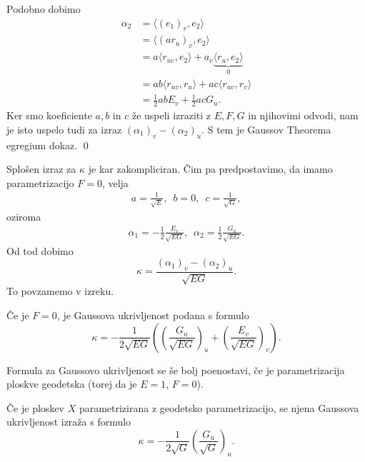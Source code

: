 Podobno dobimo \begin{align*}
    \alpha_2 &= \langle (e_1)_v, e_2 \rangle  \\
     &= \langle (a r_u)_v, e_2 \rangle  \\
     &= a \langle r_{uv}, e_2 \rangle + a_v \underbrace{\langle r_u, e_2 \rangle}_0  \\
    &= ab \langle r_{uv}, r_u \rangle + ac \langle r_{uv}, r_v \rangle \\
    &= \frac{1}{2} ab E_v + \frac{1}{2}ac G_u. 
\end{align*}
Ker smo koeficiente $a, b$ in $c$ že uspeli izraziti z $E, F, G$ in njihovimi odvodi, nam je isto uspelo tudi za izraz $(\alpha_1)_v - (\alpha_2)_u$.
S tem je Gaussov Theorema egregium dokaz.
\qed

\begin{opomba}
Splošen izraz za $\kappa$ je kar zakompliciran. Čim pa predpostavimo, da imamo parametrizacijo $F =0$, velja \begin{align*}
    a = \frac{1}{\sqrt{E} }, \,\,\,  b = 0, \,\,\,   c = \frac{1}{\sqrt{G}},
\end{align*}oziroma \begin{align*}
    \alpha_1 = -\frac{1}{2} \frac{E_v}{\sqrt{EG} }, \,\,\, \alpha_2 = \frac{1}{2} \frac{G_u}{\sqrt{EG} }.
\end{align*}
Od tod dobimo \begin{equation*}
\kappa  = \frac{(\alpha_1)_v - (\alpha_2)_u}{\sqrt{EG}}.
\end{equation*}
To povzamemo v izreku.
\end{opomba}

\begin{izrek}
\label{izr_gaussova_ukrivljenost_v_primeru_F_enako_0}
Če je $F = 0$, je Gaussova ukrivljenost podana s formulo \begin{equation*}
\kappa = - \frac{1}{2\sqrt{EG}} \left(\left(  \frac{G_u}{\sqrt{EG} } \right)_u + \left( \frac{E_v}{\sqrt{EG} } \right)_v \right).
\end{equation*}  
\end{izrek}

Formula za Gaussovo ukrivljenost se še bolj poenostavi, če je parametrizacija ploskve geodetska (torej da je $E = 1$, $F = 0$).

\begin{izrek}
\label{izr_gaussova_ukrivljenost_pri_geodetski_parametrizaciji}
 Če je ploskev $X$ parametrizirana z geodetsko parametrizacijo, se njena Gaussova ukrivljenost izraža s formulo \begin{equation*}
 \kappa = - \frac{1}{2\sqrt{G}} \left( \frac{G_u}{\sqrt{G}} \right)_u .
 \end{equation*}  
\end{izrek}

